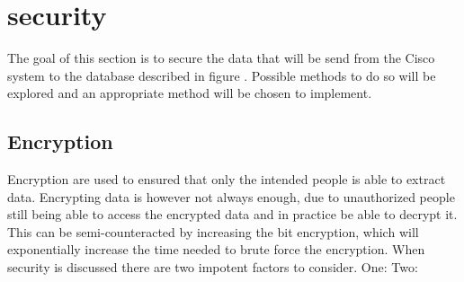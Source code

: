 \section{security}
The goal of this section is to secure the data that will be send from the Cisco system to the database described in figure . Possible methods to do so will be explored and an appropriate method will be chosen to implement.

\subsection{Encryption}
Encryption are used to ensured that only the intended people is able to extract data. Encrypting data is however not always enough, due to unauthorized people still being able to access the encrypted data and in practice be able to decrypt it. This can be semi-counteracted by increasing the bit encryption, which will exponentially increase the time needed to brute force the encryption. When security is discussed there are two impotent factors to consider. One: Two: 